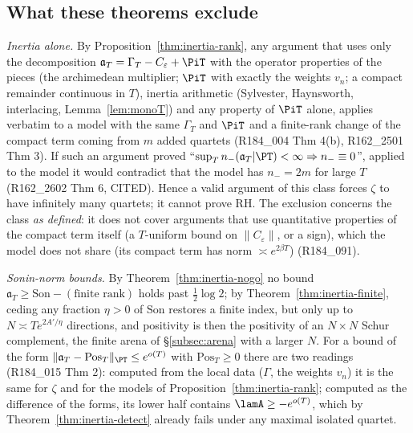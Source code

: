 \subsection{What these theorems exclude}
\emph{Inertia alone.} By Proposition~\ref{thm:inertia-rank}, any argument that uses only the decomposition
$\mathfrak a_T=\Gamma_T-C_\varepsilon+\PiT$ with the operator properties of the pieces (the archimedean multiplier;
$\PiT$ with exactly the weights $v_n$; a compact remainder continuous in $T$), inertia arithmetic (Sylvester,
Haynsworth, interlacing, Lemma~\ref{lem:monoT}) and any property of $\PiT$ alone, applies verbatim to a model with
the same $\Gamma_T$ and $\PiT$ and a finite-rank change of the compact term coming from $m$ added quartets
(R184\_004 Thm 4(b), R162\_2501 Thm 3). If such an argument proved ``$\sup_Tn_-(\mathfrak a_T|\PT)<\infty
\Rightarrow n_-\equiv0$'', applied to the model it would contradict that the model has $n_-=2m$ for large $T$
(R162\_2602 Thm 6, CITED). Hence a valid argument of this class forces $\zeta$ to have infinitely many quartets;
it cannot prove RH. The exclusion concerns the class \emph{as defined}: it does not cover arguments that use
quantitative properties of the compact term itself (a $T$-uniform bound on $\|C_\varepsilon\|$, or a sign),
which the model does not share (its compact term has norm $\asymp e^{2\beta T}$) (R184\_091).

\emph{Sonin-norm bounds.} By Theorem~\ref{thm:inertia-nogo} no bound
$\mathfrak a_T\ge\mathrm{Son}-(\text{finite rank})$ holds past $\frac12\log2$; by
Theorem~\ref{thm:inertia-finite}, ceding any fraction $\eta>0$ of $\mathrm{Son}$ restores a finite index, but only
up to $N\asymp Te^{2A'/\eta}$ directions, and positivity is then the positivity of an $N\times N$ Schur complement,
the finite arena of \S\ref{subsec:arena} with a larger $N$. For a bound of the form
$\|\mathfrak a_T-\mathrm{Pos}_T\|_{\PT}\le e^{o(T)}$ with $\mathrm{Pos}_T\ge0$ there are two readings
(R184\_015 Thm 2): computed from the local data ($\Gamma$, the weights $v_n$) it is the same for $\zeta$ and for the
models of Proposition~\ref{thm:inertia-rank}; computed as the difference of the forms, its lower half contains
$\lamA\ge-e^{o(T)}$, which by Theorem~\ref{thm:inertia-detect} already fails under any maximal isolated quartet.

